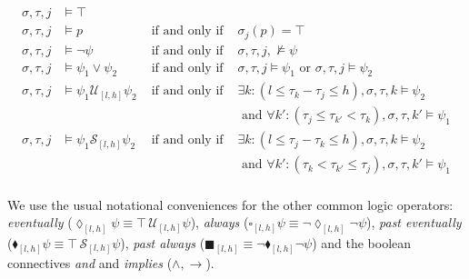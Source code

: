 \documentclass[]{llncs}
\begin{document}

\begin{align*}
\sigma, \tau, j &\vDash \top & &\\
\sigma, \tau, j &\vDash p & \text{ if and only if } & \sigma_{j}(p) = \top \\
\sigma, \tau, j &\vDash \neg \psi & \text{ if and only if } & \sigma, \tau, j, \nvDash \psi \\
\sigma, \tau, j &\vDash \psi_1 \vee \psi_2 & \text{ if and only if } & \sigma, \tau, j \vDash \psi_1 \text{ or } \sigma, \tau, j \vDash \psi_2 \\
\sigma, \tau, j &\vDash \psi_1 \mathcal{U}_{[l,h]} \psi_2 & \text{ if and only if } 
	& \exists k: (l \leq \tau_k-\tau_j \leq h), \sigma, \tau, k \vDash \psi_2  \\
	& & & \text{ and } \forall k': (\tau_j \leq \tau_{k'} < \tau_k), \sigma, \tau, k' \vDash \psi_1 \\
\sigma,\tau, j &\vDash \psi_1 \mathcal{S}_{[l,h]} \psi_2 & \text{ if and only if } 
	& \exists k:  (l \leq \tau_j - \tau_k \leq h),  \sigma, \tau, k \vDash \psi_2 \\
	& & & \text{ and } \forall k': (\tau_k < \tau_{k'} \leq \tau_j), \sigma, \tau, k' \vDash \psi_1 \\
\end{align*}



We use the usual notational conveniences for the other common logic operators: \emph{eventually} ($\lozenge_{[l,h]} \psi \equiv \top\, \mathcal{U}_{[l,h]} \psi$), \emph{always} ($\square_{[l,h]} \psi \equiv \neg \lozenge_{[l,h]} \neg \psi$), \emph{past eventually} ($\blacklozenge_{[l,h]} \psi \equiv \top\, \mathcal{S}_{[l,h]} \psi$), \emph{past always} ($\blacksquare_{[l,h]} \equiv \neg \blacklozenge_{[l,h]} \neg \psi$) and the boolean connectives \emph{and} and \emph{implies} ($\wedge, \rightarrow$). 
\end{document}
